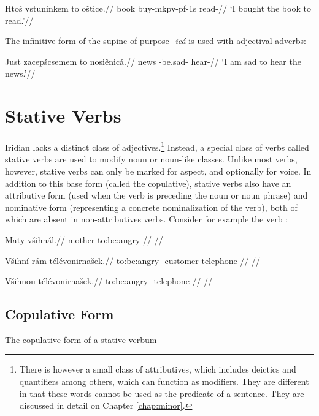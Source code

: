 	\pex
\begingl
\gla Hto\v{s} vstuninkem to o\v{s}tice.//
\glb book buy-mk{pv-pf-1s}  read-//
\glft `I bought the book to read.'//
\endgl
\xe

\par The infinitive form of the supine of purpose \textit{-icá} is used with adjectival adverbs:

\pex
\begingl
\gla Just zacep\v{s}csemem to nosiênicá.//
\glb news -be.sad-  hear-//
\glft `I am sad to hear the news.'//
\endgl
\xe


\section{Stative Verbs}

Iridian lacks a distinct class of adjectives.\footnote{There is however a small class of attributives, which includes deictics and quantifiers among others, which can function as modifiers. They are different in that these words cannot be used as the predicate of a sentence. They are discussed in detail on Chapter \ref{chap:minor}.} Instead, a special class of verbs called stative verbs are used to modify noun or noun-like classes. Unlike most verbs, however, stative verbs can only be marked for aspect, and optionally for voice. In addition to this base form (called the copulative), stative verbs also have an attributive form (used when the verb is preceding the noun or noun phrase) and nominative form (representing a concrete nominalization of the verb), both of which are absent in non-attributives verbs. Consider for example the verb  :

\pex
\a
\begingl
\gla Maty v\v{s}ihn\'al.//
\glb mother to:be:angry-//
\glft {}//
\endgl

\a
\begingl
\gla V\v{s}ihn\'i r\'am t\'el\'evonirna\v{s}ek.//
\glb to:be:angry- customer telephone-//
\glft {}//
\endgl

\a
\begingl
\gla V\v{s}ihnou t\'el\'evonirna\v{s}ek.//
\glb to:be:angry- telephone-//
\glft {}//
\endgl

\xe

\subsection{Copulative Form}
The copulative form of a stative verbum

